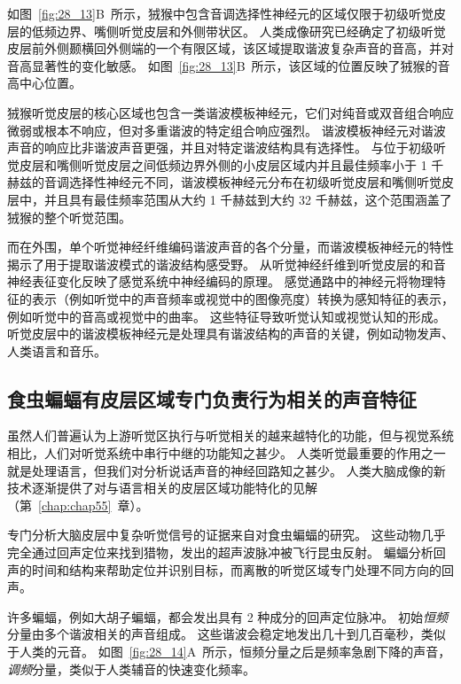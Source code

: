 如图~\ref{fig:28_13}B~所示，狨猴中包含音调选择性神经元的区域仅限于初级听觉皮层的低频边界、嘴侧听觉皮层和外侧带状区。
人类成像研究已经确定了初级听觉皮层前外侧颞横回外侧端的一个有限区域，该区域提取谐波复杂声音的音高，并对音高显著性的变化敏感。
如图~\ref{fig:28_13}B~所示，该区域的位置反映了狨猴的音高中心位置。


狨猴听觉皮层的核心区域也包含一类谐波模板神经元，它们对纯音或双音组合响应微弱或根本不响应，但对多重谐波的特定组合响应强烈。
谐波模板神经元对谐波声音的响应比非谐波声音更强，并且对特定谐波结构具有选择性。
与位于初级听觉皮层和嘴侧听觉皮层之间低频边界外侧的小皮层区域内并且最佳频率小于 1 千赫兹的音调选择性神经元不同，谐波模板神经元分布在初级听觉皮层和嘴侧听觉皮层中，并且具有最佳频率范围从大约 1 千赫兹到大约 32 千赫兹，这个范围涵盖了狨猴的整个听觉范围。


而在外围，单个听觉神经纤维编码谐波声音的各个分量，而谐波模板神经元的特性揭示了用于提取谐波模式的谐波结构感受野。
从听觉神经纤维到听觉皮层的和音神经表征变化反映了感觉系统中神经编码的原理。
感觉通路中的神经元将物理特征的表示（例如听觉中的声音频率或视觉中的图像亮度）转换为感知特征的表示，例如听觉中的音高或视觉中的曲率。
这些特征导致听觉认知或视觉认知的形成。
听觉皮层中的谐波模板神经元是处理具有谐波结构的声音的关键，例如动物发声、人类语言和音乐。



\subsection{食虫蝙蝠有皮层区域专门负责行为相关的声音特征}

虽然人们普遍认为上游听觉区执行与听觉相关的越来越特化的功能，但与视觉系统相比，人们对听觉系统中串行中继的功能知之甚少。
人类听觉最重要的作用之一就是处理语言，但我们对分析说话声音的神经回路知之甚少。
人类大脑成像的新技术逐渐提供了对与语言相关的皮层区域功能特化的见解（第~\ref{chap:chap55}~章）。


专门分析大脑皮层中复杂听觉信号的证据来自对食虫蝙蝠的研究。
这些动物几乎完全通过回声定位来找到猎物，发出的超声波脉冲被飞行昆虫反射。
蝙蝠分析回声的时间和结构来帮助定位并识别目标，而离散的听觉区域专门处理不同方向的回声。


许多蝙蝠，例如大胡子蝙蝠，都会发出具有 2 种成分的回声定位脉冲\cite{suga1983specificity,suga1984neural}。
初始\emph{恒频}分量由多个谐波相关的声音组成。 %
这些谐波会稳定地发出几十到几百毫秒，类似于人类的元音。
如图~\ref{fig:28_14}A~所示，恒频分量之后是频率急剧下降的声音，\textit{调频}分量，类似于人类辅音的快速变化频率。


